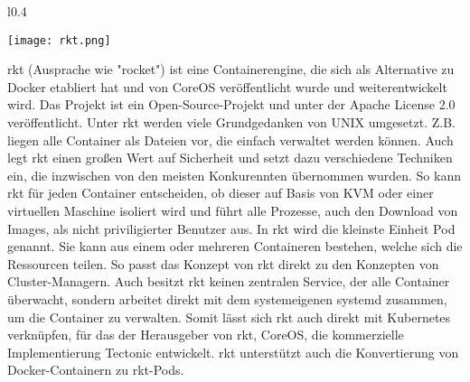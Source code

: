 \begin{wrapfigure}{l}{0.4\textwidth}
	\vspace{-40pt}
	\begin{center}
		\texttt{[image: rkt.png]}
	\end{center}
	\vspace{-15pt}
	\caption[Logo rkt]{ \footnotemark}
	\label{fig:rkt}
	\vspace{-30pt}
\end{wrapfigure}


rkt (Ausprache wie "rocket") ist eine Containerengine, die sich als Alternative zu Docker etabliert hat und von CoreOS veröffentlicht wurde und weiterentwickelt wird. Das Projekt ist ein Open-Source-Projekt und unter der Apache License 2.0 veröffentlicht. \citep{RepoRkt} Unter rkt werden viele Grundgedanken von UNIX umgesetzt. Z.B. liegen alle Container als Dateien vor, die einfach verwaltet werden können. Auch legt rkt einen großen Wert auf Sicherheit und setzt dazu verschiedene Techniken ein, die inzwischen von den meisten Konkurennten übernommen wurden. So kann rkt für jeden Container entscheiden, ob dieser auf Basis von KVM oder einer virtuellen Maschine isoliert wird und führt alle Prozesse, auch den Download von Images, als nicht priviligierter Benutzer aus. In rkt wird die kleinste Einheit Pod genannt. Sie kann aus einem oder mehreren Containeren bestehen, welche sich die Ressourcen teilen. So passt das Konzept von  rkt direkt zu den Konzepten von  Cluster-Managern. Auch besitzt rkt keinen zentralen Service, der alle Container überwacht, sondern arbeitet direkt mit dem systemeigenen systemd zusammen, um die Container zu verwalten. Somit lässt sich rkt auch direkt mit Kubernetes verknüpfen, für das der Herausgeber von rkt, CoreOS, die kommerzielle Implementierung Tectonic entwickelt. rkt unterstützt auch die Konvertierung von Docker-Containern zu rkt-Pods. \citep{HomepageRkt,ixrkt}

